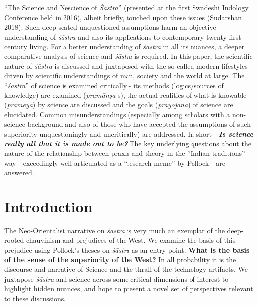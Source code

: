 “The Science and Nescience of \textit{Śāstra}” (presented at the first Swadeshi Indology Conference held in 2016), albeit briefly, touched upon these issues (Sudarshan 2018). Such deep-seated unquestioned assumptions harm an objective understanding of \textit{śāstra} and also its applications to contemporary twenty-first century living. For a better understanding of \textit{śāstra} in all its nuances, a deeper comparative analysis of science and \textit{śāstra} is required. In this paper, the scientific nature of \textit{śāstra} is discussed and juxtaposed with the so-called modern lifestyles driven by scientific understandings of man, society and the world at large. The “\textit{śāstra}” of science is examined critically - its methods (logics/sources of knowledge) are examined (\textit{pramānṣa}-s), the actual realities of what is knowable (\textit{prameya}) by science are discussed and the goals (\textit{prayojana}) of science are elucidated. Common misunderstandings (especially among scholars with a non-science background and also of those who have accepted the assumptions of such superiority unquestioningly and uncritically) are addressed. In short - \textbf{\textit{Is science really all that it is made out to be?}} The key underlying questions about the nature of the relationship between praxis and theory in the “Indian traditions” way - exceedingly well articulated as a “research meme” by Pollock - are answered.


\section*{Introduction}

The Neo-Orientalist narrative on \textit{śāstra} is very much an exemplar of the deep-rooted chauvinism and prejudices of the West. We examine the basis of this prejudice using Pollock’s theses on \textit{śāstra} as an entry point. \textbf{What is the basis of the sense of the superiority of the West?} In all probability it is the discourse and narrative of Science and the thrall of the technology artifacts. We juxtapose \textit{śāstra} and science across some critical dimensions of interest to highlight hidden nuances, and hope to present a novel set of perspectives relevant to these discussions.

